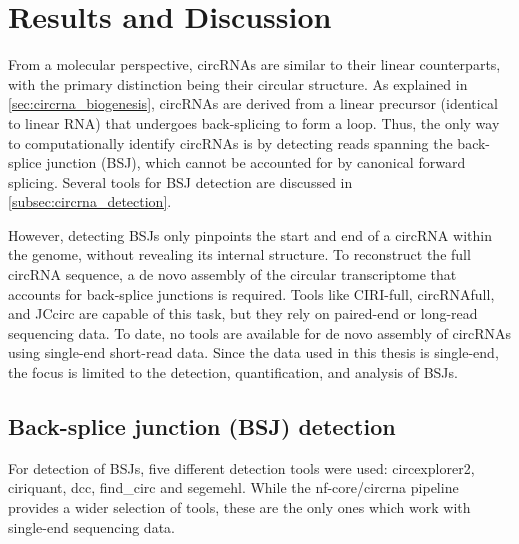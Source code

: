 \chapter{Results and Discussion}

From a molecular perspective, circRNAs are similar to their linear
counterparts, with the primary distinction being their circular structure.
As explained in \cref{sec:circrna_biogenesis}, circRNAs are derived from a
linear precursor (identical to linear RNA) that undergoes back-splicing to form
a loop.
Thus, the only way to computationally identify circRNAs is by detecting reads
spanning the back-splice junction (BSJ), which cannot be accounted for by
canonical forward splicing.
Several tools for BSJ detection are discussed in
\cref{subsec:circrna_detection}.

However, detecting BSJs only pinpoints the start and end of a circRNA within
the genome, without revealing its internal structure.
To reconstruct the full circRNA sequence, a de novo assembly of the circular
transcriptome that accounts for back-splice junctions is required.
Tools like CIRI-full, circRNAfull, and JCcirc are capable of this task, but
they rely on paired-end or long-read sequencing data.
To date, no tools are available for de novo assembly of circRNAs using
single-end short-read data.
Since the data used in this thesis is single-end, the focus is limited to the
detection, quantification, and analysis of BSJs.

\section{Back-splice junction (BSJ) detection}

For detection of BSJs, five different detection tools were used: circexplorer2,
ciriquant, dcc, find\_circ and segemehl.
While the nf-core/circrna pipeline provides a wider selection of tools, these
are the only ones which work with single-end sequencing data.


